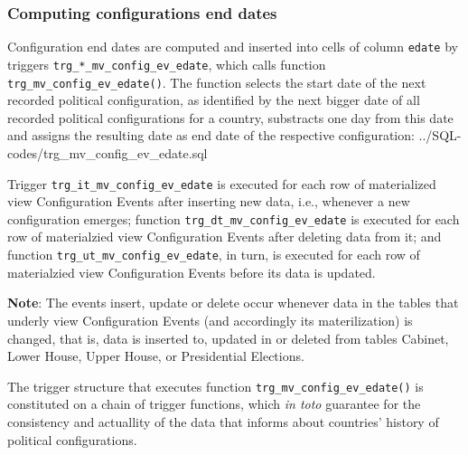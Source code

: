 \subsubsection{Computing configurations end dates}\label{subsubsec_trg_mv_config_ev_edate}
Configuration end dates are computed and inserted into cells of column \texttt{edate} by triggers \texttt{trg\_*\_mv\_config\_ev\_edate}, which calls function \texttt{trg\_mv\_config\_ev\_edate()}.
The function selects the start date of the next recorded political configuration, as identified by the next bigger date of all recorded political configurations for a country, substracts one day from this date and assigns the resulting date as end date of the respective configuration:
%
{../SQL-codes/trg_mv_config_ev_edate.sql}

Trigger \texttt{trg\_it\_mv\_config\_ev\_edate} is executed for each row of materialized view Configuration Events after inserting new data, i.e., whenever a new configuration emerges; function  
\texttt{trg\_dt\_mv\_config\_ev\_edate} is executed for each row of materialzied view Configuration Events after deleting data from it; and 
function \texttt{trg\_ut\_mv\_config\_ev\_edate}, in turn, is executed for each row of materialzied view Configuration Events before its data is updated.  

{\bf Note}: The events insert, update or delete occur whenever data in the tables that underly view Configuration Events (and accordingly its materilization) is changed, that is, data is inserted to, updated in or deleted from tables Cabinet, Lower House, Upper House, or Presidential Elections. 

The trigger structure that executes function \texttt{trg\_mv\_config\_ev\_edate()} is constituted on a chain of trigger functions, which {\em in toto} guarantee for the consistency and actuallity of the data that informs about countries' history of political configurations.